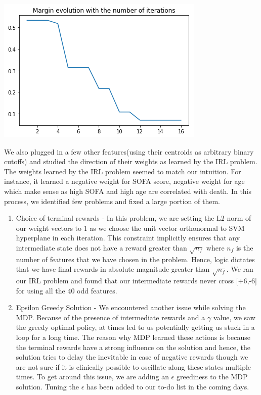 \documentclass[twoside,11pt]{article}
\begin{document}
\begin{itemize}
\begin{center}
\includegraphics[scale=0.5]{Margin_convergence.png}\\[10pt]
\end{center}
We also plugged in a few other features(using their centroids as arbitrary binary cutoffs) and studied the direction of their weights as learned by the IRL problem. The weights learned by the IRL problem seemed to match our intuition. For instance, it learned a negative weight for SOFA score, negative weight for age which make sense as high SOFA and high age are correlated with death.
In this process, we identified few problems and fixed a large portion of them.
\begin{enumerate}
\item Choice of terminal rewards - In this problem, we are setting the L2 norm of our weight vectors to 1 as we choose the unit vector orthonormal to SVM hyperplane in each iteration. This constraint implicitly ensures that any intermediate state does not have a reward greater than $\sqrt{n_f}$ where $n_f$ is the number of features that we have chosen in the problem. Hence, logic dictates that we have final rewards in absolute magnitude greater than $\sqrt{n_f}$. We ran our IRL problem and found that our intermediate rewards never cross [+6,-6] for using all the 40 odd features. 
\item Epsilon Greedy Solution - We encountered another issue while solving the MDP. Because of the presence of intermediate rewards and a $\gamma$ value, we saw the greedy optimal policy, at times led to us potentially getting us stuck in a loop for a long time. The reason why MDP learned these actions is because the terminal rewards have a strong influence on the solution and hence, the solution tries to delay the inevitable in case of negative rewards though we are not sure if it is clinically possible to oscillate along these states multiple times. To get around this issue, we are adding an $\epsilon$ greediness to the MDP solution. Tuning the $\epsilon$ has been added to our to-do list in the coming days.

\end{enumerate}
\end{itemize}
\end{document}
